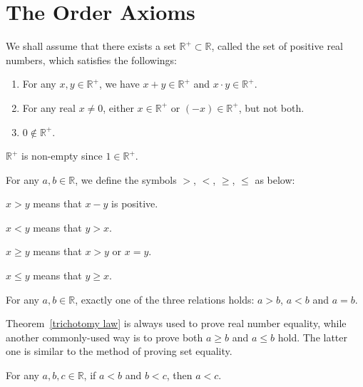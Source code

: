 	\section{The Order Axioms}
	\begin{definitionenv}
		We shall assume that there exists a set $\mathbb{R}^+ \subset \mathbb{R}$, called the set of positive real numbers, which satisfies the followings:
		\begin{enumerate}
			\item For any $x,y\in \mathbb{R}^+$, we have $x+y \in \mathbb{R}^+$ and $x\cdot y \in \mathbb{R}^+$.
			\item For any real $x \neq 0$, either $x\in \mathbb{R}^+$ or $(-x)\in \mathbb{R}^+$, but not both. 
			\item $0 \notin \mathbb{R}^+$.
		\end{enumerate}
	\end{definitionenv}
	\begin{corollaryenv}
		$\mathbb{R}^+$ is non-empty since $1 \in \mathbb{R}^+$.
	\end{corollaryenv}
	\begin{notationenv}
		For any $a,b\in \mathbb{R}$, we define the symbols $>$, $<$, $\geq$, $\leq$ as below:
			\item $x>y$ means that $x-y$ is positive. \centering
			\item $x<y$ means that $y>x$. \centering
			\item $x\ge y$ means that $x>y$ or $x=y$. \centering
			\item $x \le y$ means that $y \ge x$. \centering
	\end{notationenv}
	\begin{theoremenv}\label{trichotomy law}
		For any $a,b\in \mathbb{R}$, exactly one of the three relations holds: $a>b$, $a<b$ and $a=b$.
	\end{theoremenv}
	\begin{remarkenv}
		Theorem~\ref{trichotomy law} is always used to prove real number equality, while another commonly-used way is to prove both $a\ge b$ and $a \le b$ hold. The latter one is similar to the method of proving set equality.
	\end{remarkenv}
	\begin{theoremenv}
		For any $a,b,c\in \mathbb{R}$, if $a<b$ and $b<c$, then $a<c$.
	\end{theoremenv}
